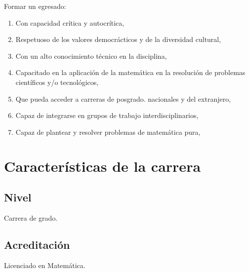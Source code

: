 \documentclass[a4paper, 12pt]{article}
\begin{document}
Formar un egresado:

\begin{enumerate}

 \item Con capacidad crítica y autocrítica,
 \item Respetuoso de los valores democrácticos y de la diversidad cultural,  
  \item Con un alto conocimiento técnico en la disciplina,
 \item Capacitado en la aplicación de la matemática en la
resolución de problemas científicos y/o tecnológicos,
\item Que pueda acceder a carreras de posgrado.
nacionales y del extranjero, 
\item Capaz de integrarse en grupos de trabajo interdisciplinarios,
\item Capaz de plantear y resolver problemas de matemática pura,

\end{enumerate}








\section{Características de la carrera}


\subsection{Nivel} Carrera de grado.

\subsection{Acreditación} Licenciado en Matemática.
\end{document}
